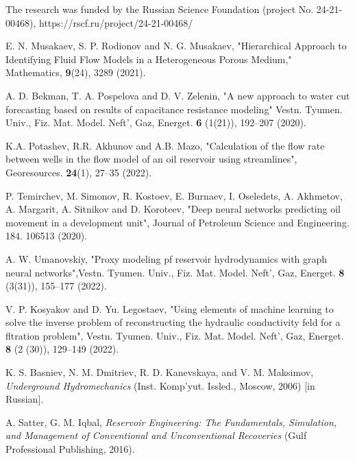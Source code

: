 \documentclass[
11pt,%
tightenlines,%
twoside,%
onecolumn,%
nofloats,%
nobibnotes,%
nofootinbib,%
superscriptaddress,%
noshowpacs,%
centertags]%
{revtex4}
\begin{document}
\begin{acknowledgments}
The research was funded by the Russian Science Foundation (project No. 24-21-00468), https://rscf.ru/project/24-21-00468/
\end{acknowledgments}


%
%

\begin{thebibliography}{99}
 E. N. Musakaev, S. P. Rodionov and N. G. Musakaev, "Hierarchical Approach to Identifying Fluid Flow Models in a Heterogeneous Porous Medium," Mathematics, {\bf 9}(24), 3289 (2021).

 A. D. Bekman, T. A. Pospelova and D. V. Zelenin,  "A new approach to water cut forecasting based on results of capacitance resistance modeling" Vestn. Tyumen. Univ., Fiz. Mat. Model. Neft', Gaz, Energet. {\bf 6} (1(21)), 192--207 (2020).

 K.A. Potashev, R.R. Akhunov and  A.B. Mazo, "Calculation of the flow rate between wells in the flow model of an oil reservoir using streamlines", Georesources. {\bf 24}(1), 27--35 (2022).

P. Temirchev, M. Simonov, R. Kostoev, E. Burnaev, I. Oseledets, A. Akhmetov, A. Margarit, A. Sitnikov and D. Koroteev, "Deep neural networks predicting oil movement in a development unit", Journal of Petroleum Science and Engineering. 184. 106513 (2020).

A. W. Umanovskiy, "Proxy modeling pf reservoir hydrodynamics with graph neural networks",Vestn. Tyumen. Univ., Fiz. Mat. Model. Neft', Gaz, Energet. {\bf 8} (3(31)), 155--177 (2022).

V. P. Kosyakov and D. Yu. Legostaev, "Using elements of machine learning to solve the inverse problem of reconstructing the hydraulic conductivity feld for a fltration problem", Vestn. Tyumen. Univ., Fiz. Mat. Model. Neft', Gaz, Energet. {\bf 8} (2 (30)), 129--149 (2022).

K. S. Basniev, N. M. Dmitriev, R. D. Kanevskaya, and V. M. Maksimov, \textit{Underground Hydromechanics} (Inst. Komp'yut. Issled., Moscow, 2006) [in Russian].

A. Satter, G. M. Iqbal, \textit{Reservoir Engineering: The Fundamentals, Simulation, and Management of Conventional and Unconventional Recoveries} (Gulf Professional Publishing, 2016).


\end{thebibliography}
\end{document}
